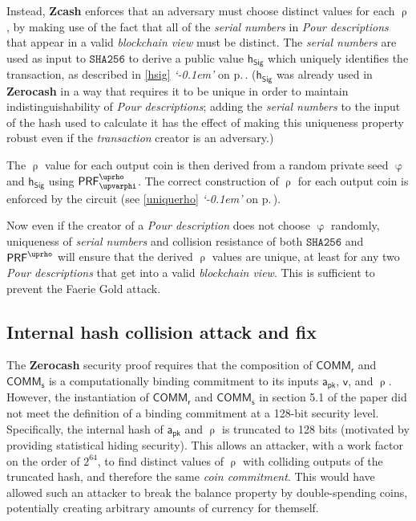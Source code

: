 \documentclass{article}
\newcommand{\crossref}[1]{\autoref{#1} \emph{`\nameref*{#1}\kern -0.1em'} on p.\,\pageref*{#1}}
\newcommand{\term}[1]{\textsl{#1}\xspace}
\newcommand{\termbf}[1]{\textbf{#1}\xspace}
\newcommand{\Zcash}{\termbf{Zcash}}
\newcommand{\Zerocash}{\termbf{Zerocash}}
\newcommand{\coinCommitment}{\term{coin commitment}}
\newcommand{\PourDescription}{\term{Pour description}}
\newcommand{\PourDescriptions}{\term{Pour descriptions}}
\newcommand{\transaction}{\term{transaction}}
\newcommand{\blockchainview}{\term{blockchain view}}
\newcommand{\serialNumbers}{\term{serial numbers}}
\newcommand{\FullHash}{\mathtt{SHA256}}
\newcommand{\AuthPublic}{\mathsf{a_{pk}}}
\newcommand{\Value}{\mathsf{v}}
\newcommand{\CoinCommitRand}{\mathsf{r}}
\newcommand{\CoinAddressRand}{\mathsf{\uprho}}
\newcommand{\CoinAddressPreRand}{\mathsf{\upvarphi}}
\newcommand{\CoinCommitS}{\mathsf{s}}
\newcommand{\PRF}[2]{\mathsf{{PRF}^{#2}_\mathnormal{#1}}}
\newcommand{\PRFrho}[1]{\PRF{#1}{\CoinAddressRand}}
\newcommand{\hSig}{\mathsf{h_{Sig}}}
\newcommand{\COMM}[1]{\mathsf{COMM}_{#1}}
\begin{document}
Instead, \Zcash enforces that an adversary must choose distinct values
for each $\CoinAddressRand$, by making use of the fact that all of the
\serialNumbers in \PourDescriptions that appear in a valid \blockchainview
must be distinct. The \serialNumbers are used as input to $\FullHash$
to derive a public value $\hSig$ which uniquely identifies the transaction,
as described in \crossref{hsig}. ($\hSig$ was already used in \Zerocash
in a way that requires it to be unique in order to maintain
indistinguishability of \PourDescriptions; adding the \serialNumbers
to the input of the hash used to calculate it has the effect of making
this uniqueness property robust even if the \transaction creator is an
adversary.)

The $\CoinAddressRand$ value for each output coin is then derived from
a random private seed $\CoinAddressPreRand$ and $\hSig$ using
$\PRFrho{\CoinAddressPreRand}$. The correct construction of
$\CoinAddressRand$ for each output coin is enforced by the circuit
(see \crossref{uniquerho}).

Now even if the creator of a \PourDescription does not choose
$\CoinAddressPreRand$ randomly, uniqueness of \serialNumbers and
collision resistance of both $\FullHash$ and $\PRFrho{}$ will ensure
that the derived $\CoinAddressRand$ values are unique, at least for
any two \PourDescriptions that get into a valid \blockchainview.
This is sufficient to prevent the Faerie Gold attack.


\subsection{Internal hash collision attack and fix}

The \Zerocash security proof requires that the composition of
$\COMM{\CoinCommitRand}$ and $\COMM{\CoinCommitS}$ is a computationally
binding commitment to its inputs $\AuthPublic$, $\Value$, and
$\CoinAddressRand$. However, the instantiation of $\COMM{\CoinCommitRand}$
and $\COMM{\CoinCommitS}$ in section 5.1 of the paper did not meet
the definition of a binding commitment at a 128-bit security level.
Specifically, the internal hash of $\AuthPublic$ and $\CoinAddressRand$
is truncated to 128 bits (motivated by providing statistical hiding
security). This allows an attacker, with a work factor on the order of
$2^{64}$, to find distinct values of $\CoinAddressRand$ with colliding
outputs of the truncated hash, and therefore the same \coinCommitment.
This would have allowed such an attacker to break the balance property
by double-spending coins, potentially creating arbitrary amounts of
currency for themself.
\end{document}
